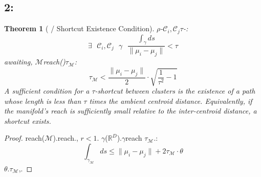 \documentclass[11pt,a4paper]{article}
\theoremstyle{plain}
\newtheorem{theorem}{Theorem}[section]
\theoremstyle{definition}
\theoremstyle{remark}
\newcommand{\RR}{\mathbb{R}}
\newcommand{\cM}{\mathcal{M}}
\newcommand{\cC}{\mathcal{C}}
\begin{document}
{\subsection{2:}
\begin{theorem}[ / Shortcut Existence Condition]
\label{thm:mdta-existence}
$\rho$-$\cC_i, \cC_j$$\tau$-: 
\begin{equation}
\boxed{\exists \text{ } \cC_i, \cC_j \text{ } \gamma \text{ } \frac{\int_\gamma ds}{\|\mu_i - \mu_j\|} < \tau}
\end{equation}
awaiting, $\cM$reach()$\tau_{\cM}$: 
\begin{equation}
 \tau_{\cM} < \frac{\|\mu_i - \mu_j\|}{2} \cdot \sqrt{\frac{1}{\tau^2} - 1}
\end{equation}
\textit{A sufficient condition for a $\tau$-shortcut between clusters is the existence of a path whose length is less than $\tau$ times the ambient centroid distance. Equivalently, if the manifold's reach is sufficiently small relative to the inter-centroid distance, a shortcut exists.}
\end{theorem}
\begin{proof}
reach($\cM$).reach., $r < 1$.
$\gamma$($\RR^D$).$\gamma$reach $\tau_{\cM}$.: 
\begin{equation}
 \int_{\gamma_{\cM}} ds \leq \|\mu_i - \mu_j\| + 2\tau_{\cM} \cdot \theta
\end{equation}
$\theta$.$\tau_{\cM}$,.
\end{proof}
}
\end{document}
